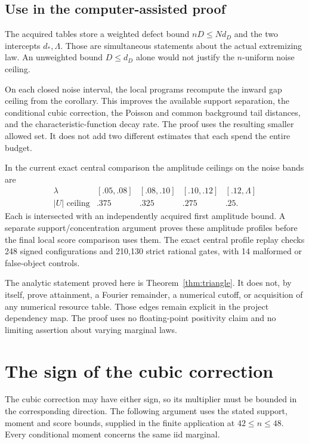 \subsection{Use in the computer-assisted proof}
The acquired tables store a weighted defect bound $nD\le Nd_D$ and the
two intercepts $d_*,\Lambda$. Those are simultaneous statements about
the actual extremizing law. An unweighted bound $D\le d_D$ alone would
not justify the $n$-uniform noise ceiling.

On each closed noise interval, the local programs recompute the inward
gap ceiling from the corollary. This improves the available support
separation, the conditional cubic correction, the Poisson and common
background tail distances, and the characteristic-function decay rate.
The proof uses the resulting smaller allowed set. It does not add two
different estimates that each spend the entire budget.

In the current exact central comparison the amplitude ceilings on the
noise bands are
\[
\begin{array}{c|cccc}
\lambda &[.05,.08]&[.08,.10]&[.10,.12]&[.12,\Lambda]\\\hline
|U|\text{ ceiling}&.375&.325&.275&.25.
\end{array}
\]
Each is intersected with an independently acquired first amplitude
bound. A separate support/concentration argument proves these amplitude
profiles before the final local score comparison uses them. The exact
central profile replay checks 248 signed configurations and 210,130
strict rational gates, with 14 malformed or false-object controls.

The analytic statement proved here is Theorem~\ref{thm:triangle}.
It does not, by itself, prove attainment, a Fourier remainder, a numerical
cutoff, or acquisition of any numerical resource table. Those edges
remain explicit in the project dependency map. The proof uses no
floating-point positivity claim and no limiting assertion about varying
marginal laws.


\section{The sign of the cubic correction}

The cubic correction may have either sign, so its multiplier must be
bounded in the corresponding direction. The following argument uses the
stated support, moment and score bounds, supplied in the finite application
at $42\le n\le48$. Every conditional moment concerns the same iid marginal.

